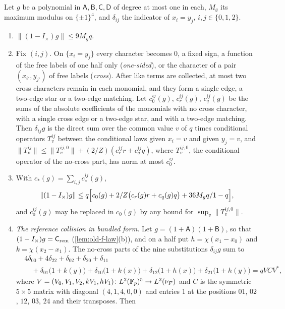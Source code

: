 \begin{lemma}\label{lem:record:conditional-collision}
Let $g$ be a polynomial in $\mathsf A,\mathsf B,\mathsf C,\mathsf D$ of degree at
most one in each, $M_g$ its maximum modulus on $\{\pm1\}^4$, and $\delta_{ij}$ the
indicator of $x_i=y_j$, $i,j\in\{0,1,2\}$.
\begin{enumerate}[label=(\alph*)]
\item $\|(1-I_\times)g\|\le9M_gq$.
\item Fix $(i,j)$. On $\{x_i=y_j\}$ every character becomes $0$, a fixed sign, a
 function of the free labels of one half only (\emph{one-sided}), or the
 character of a pair $(x_{i'},y_{j'})$ of free labels (\emph{cross}). After like
 terms are collected, at most two cross characters remain in each monomial, and
 they form a single edge, a two-edge star or a two-edge matching. Let
 $c^{ij}_0(g)$, $c^{ij}_r(g)$, $c^{ij}_q(g)$ be the sums of the absolute
 coefficients of the monomials with no cross character, with a single cross
 edge or a two-edge star, and with a two-edge matching. Then $\delta_{ij}g$ is
 the direct sum over the common value $v$ of $q$ times conditional operators
 $T^{ij}_v$ between the conditional laws given $x_i=v$ and given $y_j=v$, and
 $\|T^{ij}_v\|\le\|T^{ij,0}_v\|+(2/Z)(c^{ij}_rr+c^{ij}_qq)$, where $T^{ij,0}_v$,
 the conditional operator of the no-cross part, has norm at most $c^{ij}_0$.
\item With $c_\ast(g)=\sum_{i,j}c^{ij}_\ast(g)$,
 \[
  \|(1-I_\times)g\|\le q\Bigl[c_0(g)+\frac2Z\bigl(c_r(g)r+c_q(g)q\bigr)
  +\frac{36M_gq}{1-q}\Bigr],
 \]
 and $c^{ij}_0(g)$ may be replaced in $c_0(g)$ by any bound for
 $\sup_v\|T^{ij,0}_v\|$.
\item \emph{The reference collision in bundled form.} Let $g=(1+\mathsf A)(1+\mathsf B)$,
 so that $(1-I_\times)g=\mathsf C_{\rm rem}$ (\cref{lem:old-f-law}(b)), and on a half
 put $h=\chi(x_1-x_0)$ and $k=\chi(x_2-x_1)$. The no-cross parts of the nine
 substitutions $\delta_{ij}g$ sum to
 \[
 \begin{aligned}
  &4\delta_{00}+4\delta_{22}+\delta_{02}+\delta_{20}+\delta_{11}\\
  &\quad+\delta_{01}\bigl(1+k(y)\bigr)+\delta_{10}\bigl(1+k(x)\bigr)
  +\delta_{12}\bigl(1+h(x)\bigr)+\delta_{21}\bigl(1+h(y)\bigr)=qVCV^*,
 \end{aligned}
 \]
 where $V=(V_0,V_1,V_2,kV_1,hV_1)\colon L^2(\Fp)^5\to L^2(\nu_F)$ and $C$ is the
 symmetric $5\times5$ matrix with diagonal $(4,1,4,0,0)$ and entries $1$ at the
 positions $01$, $02$, $12$, $03$, $24$ and their transposes. Then

\end{enumerate}
\end{lemma}
